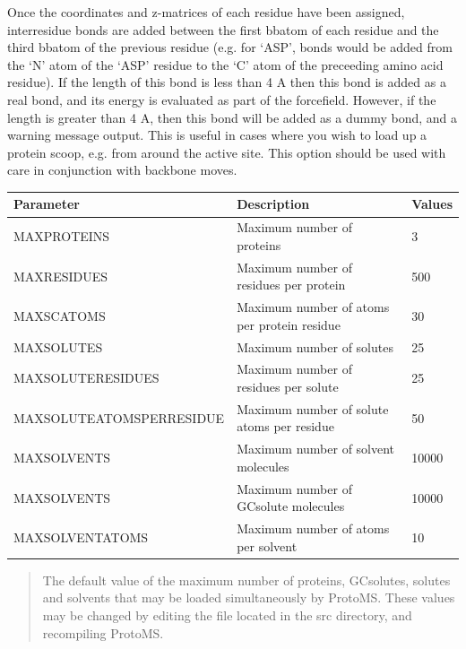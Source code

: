 \documentclass[letterpaper,10pt,english]{sphinxmanual}
\begin{document}
Once the coordinates and z-matrices of each residue have been assigned, interresidue bonds are added between the first bbatom of each residue and the third bbatom of the previous residue (e.g. for ‘ASP’, bonds would be added from the ‘N’ atom of the ‘ASP’ residue to the ‘C’ atom of the preceeding amino acid residue). If the length of this bond is less than 4 A then this bond is added as a real bond, and its energy is evaluated as part of the forcefield. However, if the length is greater than 4 A, then this bond will be added as a dummy bond, and a warning message output. This is useful in cases where you wish to load up a protein scoop, e.g. from around the active site. This option should be used with care in conjunction with backbone moves.

\begin{tabulary}{\linewidth}{|L|L|L|}
\hline
\textsf{\relax 
Parameter
} & \textsf{\relax 
Description
} & \textsf{\relax 
Values
}\\
\hline
MAXPROTEINS
 & 
Maximum number of proteins
 & 
3
\\

MAXRESIDUES
 & 
Maximum number of residues per protein
 & 
500
\\

MAXSCATOMS
 & 
Maximum number of atoms per protein residue
 & 
30
\\

MAXSOLUTES
 & 
Maximum number of solutes
 & 
25
\\

MAXSOLUTERESIDUES
 & 
Maximum number of residues per solute
 & 
25
\\

MAXSOLUTEATOMSPERRESIDUE
 & 
Maximum number of solute atoms per residue
 & 
50
\\

MAXSOLVENTS
 & 
Maximum number of solvent molecules
 & 
10000
\\

MAXSOLVENTS
 & 
Maximum number of GCsolute molecules
 & 
10000
\\

MAXSOLVENTATOMS
 & 
Maximum number of atoms per solvent
 & 
10
\\
\hline\end{tabulary}

\begin{quote}

The default value of the maximum number of proteins, GCsolutes, solutes and solvents that may be loaded simultaneously by ProtoMS. These values may be changed by editing the  file located in the src directory, and recompiling ProtoMS.
\end{quote}
\end{document}
